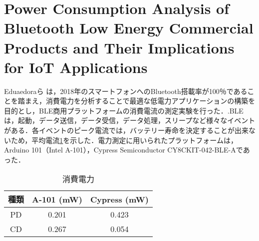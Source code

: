 \section{Power Consumption Analysis of Bluetooth Low Energy Commercial Products and Their Implications for IoT Applications}
Eduaedoraら は，2018年のスマートフォンへのBluetooth搭載率が100％であることを踏まえ，消費電力を分析することで最適な低電力アプリケーションの構築を目的とし，BLE商用プラットフォームの消費電流の測定実験を行った．\cite{Garcia-Espinosa2018}.BLEは，起動，データ送信，データ受信，データ処理，スリープなど様々なイベントがある．各イベントのピーク電流では，バッテリー寿命を決定することが出来ないため，平均電流\ref{fig:power_consumption}を示した．電力測定に用いられたプラットフォームは，Arduino 101（Intel A-101），Cypress
Semiconductor CY8CKIT-042-BLE-Aであった．

\begin{table}
    \raggedleft
    \caption{消費電力}
    \label{fig:power_consumption}
    \centering
    \begin{tabular}{|c|c|c|}
    \hline
    \textbf{種類} & \textbf{A-101 (mW)} & \textbf{Cypress (mW)} \\ \hline
    PD          & 0.201               & 0.423                 \\ \hline
    CD          & 0.267               & 0.054                 \\ \hline
    \end{tabular}
\end{table}